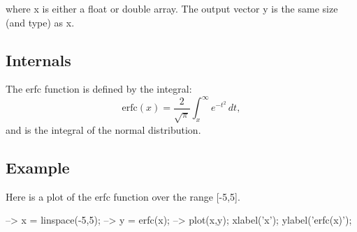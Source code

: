  where {\ttfamily x} is either a {\ttfamily float} or {\ttfamily double} array. The output vector {\ttfamily y} is the same size (and type) as {\ttfamily x}. \hypertarget{transforms_svd_Function}{}\subsection{Internals}\label{transforms_svd_Function}
The erfc function is defined by the integral\-: \[ \mathrm{erfc}(x) = \frac{2}{\sqrt{\pi}}\int_{x}^{\infty} e^{-t^2} \, dt, \] and is the integral of the normal distribution. \hypertarget{variables_struct_Example}{}\subsection{Example}\label{variables_struct_Example}
Here is a plot of the {\ttfamily erfc} function over the range {\ttfamily \mbox{[}-\/5,5\mbox{]}}.


\begin{DoxyVerbInclude}
--> x = linspace(-5,5);
--> y = erfc(x);
--> plot(x,y); xlabel('x'); ylabel('erfc(x)');
\end{DoxyVerbInclude}


